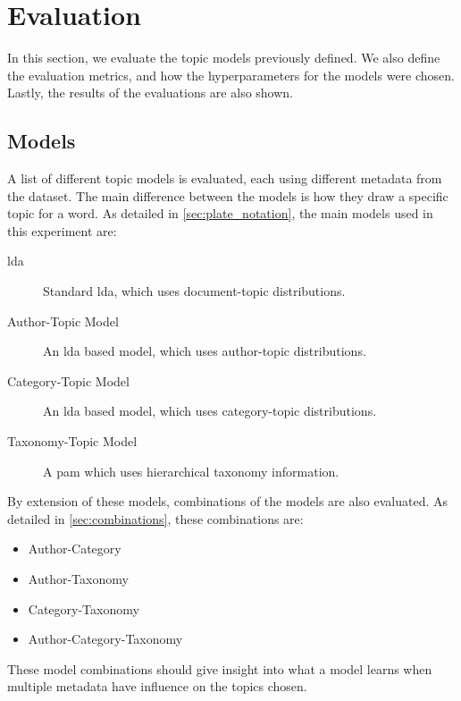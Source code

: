 \section{Evaluation}\label{sec:experiment}
In this section, we evaluate the topic models previously defined.
We also define the evaluation metrics, and how the hyperparameters for the models were chosen.
Lastly, the results of the evaluations are also shown.

\subsection{Models}\label{sec:experiment_models}
A list of different topic models is evaluated, each using different metadata from the dataset.
The main difference between the models is how they draw a specific topic for a word.
As detailed in \autoref{sec:plate_notation}, the main models used in this experiment are:
\begin{description}
	\item[\Acrlong{lda}] Standard \gls{lda}, which uses document-topic distributions.
	\item[Author-Topic Model]\cite{author_topic_2012} An \gls{lda} based model, which uses author-topic distributions.
	\item[Category-Topic Model] An \gls{lda} based model, which uses category-topic distributions.
	\item[Taxonomy-Topic Model] A \acrlong{pam} which uses hierarchical taxonomy information.
\end{description}

By extension of these models, combinations of the models are also evaluated.
As detailed in \autoref{sec:combinations}, these combinations are:
\begin{itemize}
	\item Author-Category
	\item Author-Taxonomy
	\item Category-Taxonomy
	\item Author-Category-Taxonomy
\end{itemize}
These model combinations should give insight into what a model learns when multiple metadata have influence on the topics chosen.

